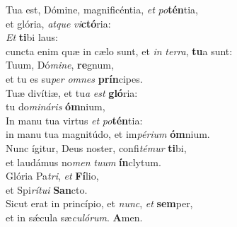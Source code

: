 \evenverse Tua est, Dómine, magnificéntia, \textit{et} \textit{po}\textbf{tén}tia,~\*\\
\evenverse et glória, \textit{at}\textit{que} \textit{vi}\textbf{ctó}ria:\\
\oddverse \textit{Et} \textbf{ti}bi laus:~\*\\
\oddverse cuncta enim quæ in cælo sunt, et \textit{in} \textit{ter}\textit{ra}, \textbf{tu}a sunt:\\
\evenverse Tuum, Dó\textit{mi}\textit{ne}, \textbf{re}gnum,~\*\\
\evenverse et tu es su\textit{per} \textit{om}\textit{nes} \textbf{prín}cipes.\\
\oddverse Tuæ divítiæ, et tu\textit{a} \textit{est} \textbf{gló}ria:~\*\\
\oddverse tu do\textit{mi}\textit{ná}\textit{ris} \textbf{óm}nium,\\
\evenverse In manu tua virtus \textit{et} \textit{po}\textbf{tén}tia:~\*\\
\evenverse in manu tua magnitúdo, et im\textit{pé}\textit{ri}\textit{um} \textbf{óm}nium.\\
\oddverse Nunc ígitur, Deus noster, confi\textit{té}\textit{mur} \textbf{ti}bi,~\*\\
\oddverse et laudámus no\textit{men} \textit{tu}\textit{um} \textbf{ín}clytum.\\
\evenverse Glória Pa\textit{tri}, \textit{et} \textbf{Fí}lio,~\*\\
\evenverse et Spi\textit{rí}\textit{tu}\textit{i} \textbf{San}cto.\\
\oddverse Sicut erat in princípio, et \textit{nunc}, \textit{et} \textbf{sem}per,~\*\\
\oddverse et in sǽcula sæ\textit{cu}\textit{ló}\textit{rum}. \textbf{A}men.\\
